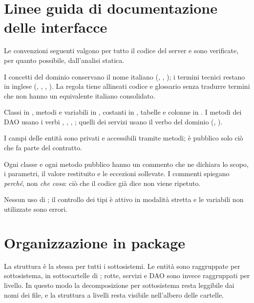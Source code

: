 \section{Linee guida di documentazione delle interfacce}
\label{sec:sdd-linee-guida}

Le convenzioni seguenti valgono per tutto il codice del server e sono
verificate, per quanto possibile, dall'analisi statica.

\begin{description}[leftmargin=1.4cm,style=nextline]
  \item[Lingua] I concetti del dominio conservano il nome italiano
    (, , ); i termini tecnici restano
    in inglese (, , , ).
    La regola tiene allineati codice e glossario senza tradurre termini che
    non hanno un equivalente italiano consolidato.
  \item[Nomi] Classi in , metodi e variabili in
    , costanti in , tabelle e
    colonne in . I metodi dei DAO usano i verbi
    , , , ; quelli dei servizi
    usano il verbo del dominio (, ).
  \item[Visibilità] I campi delle entità sono privati e accessibili tramite
    metodi; è pubblico solo ciò che fa parte del contratto.
  \item[Documentazione] Ogni classe e ogni metodo pubblico hanno un commento
    che ne dichiara lo scopo, i parametri, il valore restituito e le
    eccezioni sollevate. I commenti spiegano \emph{perché}, non
    \emph{che cosa}: ciò che il codice già dice non viene ripetuto.
  \item[Tipi] Nessun uso di ; il controllo dei tipi è attivo in
    modalità stretta e le variabili non utilizzate sono errori.
\end{description}

\section{Organizzazione in package}


La struttura è la stessa per tutti i sottosistemi. Le entità sono raggruppate
per sottosistema, in sottocartelle di ; rotte, servizi e DAO sono
invece raggruppati per livello. In questo modo la decomposizione per
sottosistema resta leggibile dai nomi dei file, e la struttura a livelli resta
visibile nell'albero delle cartelle.


